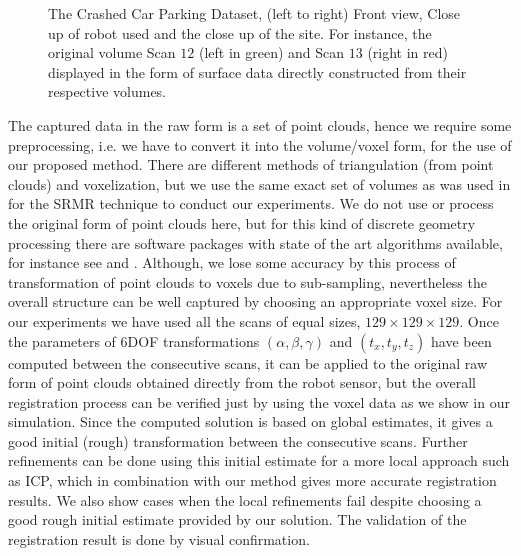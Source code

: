 \documentclass{UCF_ETD}
\begin{document}
\begin{figure}[H]
\begin{center}
\caption{ The Crashed Car Parking Dataset, (left to right) Front view, Close up of robot used and the close up of the site.  For instance, the original volume Scan $12$ (left in green) and Scan $13$ (right in red) displayed in the form of surface data directly constructed from their respective volumes. }
\label{CrashedCarParkingDatasetScan12-13.fig}
\end{center}
\end{figure}

The captured data in the raw form is a set of point clouds, hence we require some preprocessing, i.e. we have to convert it into the volume/voxel form, for the use of our proposed method. There are different methods of triangulation (from point clouds) and voxelization, but we use the same exact set of volumes as was used in \cite{Bulow2013} for the SRMR technique to conduct our experiments. We do not use or process the original form of point clouds here, but for this kind of discrete geometry processing there are software packages with state of the art algorithms available, for instance see \cite{SPHARM-MAT2016} and \cite{CGAL2016}. Although, we lose some accuracy by this process of transformation of point clouds to voxels due to sub-sampling, nevertheless the overall structure can be well captured by choosing an appropriate voxel size. For our experiments we have used all the scans of equal sizes, $129 \times 129 \times 129$. Once the parameters of $6$DOF transformations $(\alpha, \beta, \gamma)$ and $(t_x, t_y, t_z)$ have been computed between the consecutive scans, it can be applied to the original raw form of point clouds obtained directly from the robot sensor, but the overall registration process can be verified just by using the voxel data as we show in our simulation. Since the computed solution is based on global estimates, it gives a good initial (rough) transformation between the consecutive scans. Further refinements can be done using this initial estimate for a more local approach such as ICP, which in combination with our method gives more accurate registration results. We also show cases when the local refinements fail despite choosing a good rough initial estimate provided by our solution. The validation of the registration result is done by visual confirmation.
\end{document}
